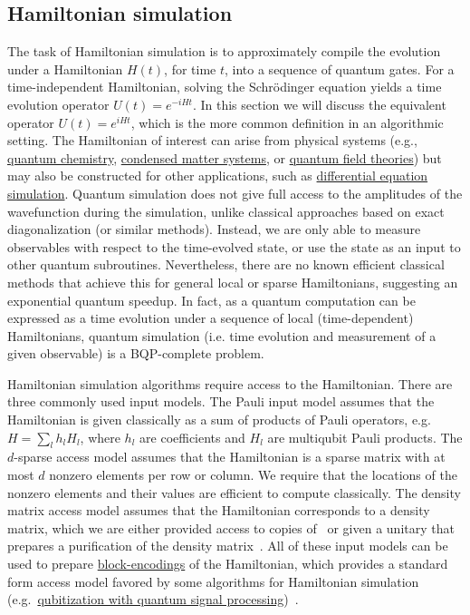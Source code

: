 


\begin{refsection}
\section{Hamiltonian simulation}\label{prim:HamiltonianSimulation}

The task of Hamiltonian simulation is to approximately compile the evolution under a Hamiltonian $H(t)$, for time $t$, into a sequence of quantum gates. For a time-independent Hamiltonian, solving the Schr\"{o}dinger equation yields a time evolution operator $U(t)=e^{-iHt}$. In this section we will discuss the equivalent operator $U(t) = e^{iHt}$, which is the more common definition in an algorithmic setting. 
The Hamiltonian of interest can arise from physical systems (e.g., \hyperref[appl:QuantumChemistry]{quantum chemistry}, \hyperref[appl:CondensedMatter]{condensed matter systems}, or \hyperref[appl:QuantumFieldTheories]{quantum field theories}) but may also be constructed for other applications, such as \hyperref[appl:DiffEq]{differential equation simulation}. Quantum simulation does not give full access to the amplitudes of the wavefunction during the simulation, unlike classical approaches based on exact diagonalization (or similar methods). Instead, we are only able to measure observables with respect to the time-evolved state, or use the state as an input to other quantum subroutines. Nevertheless, there are no known efficient classical methods that achieve this for general local or sparse Hamiltonians, suggesting an exponential quantum speedup. In fact, as a quantum computation can be expressed as a time evolution under a sequence of local (time-dependent) Hamiltonians, quantum simulation (i.e. time evolution and measurement of a given observable) is a BQP-complete problem. 

Hamiltonian simulation algorithms require access to the Hamiltonian. There are three commonly used input models. The Pauli input model assumes that the Hamiltonian is given classically as a sum of products of Pauli operators, e.g.~$H = \sum_l h_l H_l$, where $h_l$ are coefficients and $H_l$ are multiqubit Pauli products. The $d$-sparse access model assumes that the Hamiltonian is a sparse matrix with at most $d$ nonzero elements per row or column. We require that the locations of the nonzero elements and their values are efficient to compute classically. The density matrix access model assumes that the Hamiltonian corresponds to a density matrix, which we are either provided access to copies of~\cite{lloyd2013QPrincipalCompAnal} or given a unitary that prepares a purification of the density matrix~\cite{low2016HamSimQubitization}. All of these input models can be used to prepare \hyperref[prim:BlockEncodings]{block-encodings} of the Hamiltonian, which provides a standard form access model favored by some algorithms for Hamiltonian simulation (e.g.~\hyperref[prim:QSPqubitization]{qubitization with quantum signal processing})~\cite{low2016HamSimQubitization}.


\end{refsection}
